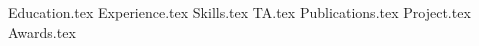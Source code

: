 \documentclass[11pt, a4paper]{awesome-cv}
\newcommand*{\sectiondir}{resume/}
\begin{document}
\makecvheader
\hspace{14.17 cm}


{Education.tex}
\vspace{0.5 cm}
{Experience.tex}
\vspace{0.5 cm}
{Skills.tex}
\vspace{0.5 cm}
{TA.tex}
\vspace{0.5 cm}
{Publications.tex}
\vspace{0.5 cm}
{Project.tex}
\vspace{0.5 cm}
{Awards.tex}
\vspace{0.5 cm}
\end{document}

